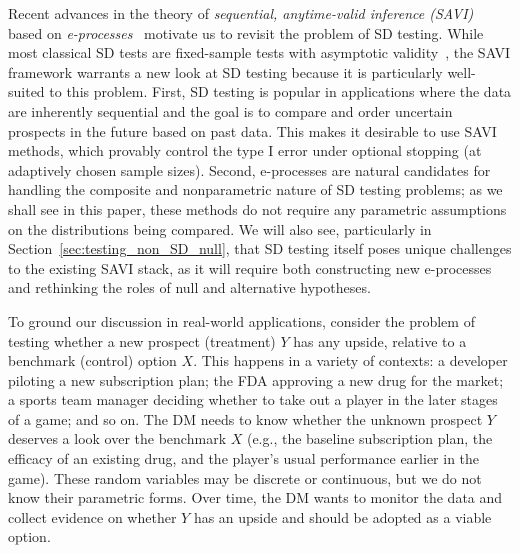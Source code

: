 \documentclass[12pt,twoside]{article}
\theoremstyle{plain}
\theoremstyle{definition}
\theoremstyle{remark}
\begin{document}
Recent advances in the theory of \emph{sequential, anytime-valid inference (SAVI)} based on \emph{e-processes}~\citep{shafer2011test,grunwald2019safe,ramdas2020admissible,ramdas2022game} motivate us to revisit the problem of SD testing. 
While most classical SD tests are fixed-sample tests with asymptotic validity~\citep[e.g.,][]{mcfadden1989testing,barrett2003consistent,linton2010improved}, the SAVI framework warrants a new look at SD testing because it is particularly well-suited to this problem. 
First, SD testing is popular in applications where the data are inherently sequential and the goal is to compare and order uncertain prospects in the future based on past data.
This makes it desirable to use SAVI methods, which provably control the type I error under optional stopping (at adaptively chosen sample sizes). 
Second, e-processes are natural candidates for handling the composite and nonparametric nature of SD testing problems; as we shall see in this paper, these methods do not require any parametric assumptions on the distributions being compared. 
We will also see, particularly in Section~\ref{sec:testing_non_SD_null}, that SD testing itself poses unique challenges to the existing SAVI stack, as it will require both constructing new e-processes and rethinking the roles of null and alternative hypotheses.


To ground our discussion in real-world applications, consider the problem of testing whether a new prospect (treatment) $Y$ has any upside, relative to a benchmark (control) option $X$. 
This happens in a variety of contexts: a developer piloting a new subscription plan; the FDA approving a new drug for the market; a sports team manager deciding whether to take out a player in the later stages of a game; and so on. 
The DM needs to know whether the unknown prospect $Y$ deserves a look over the benchmark $X$ (e.g., the baseline subscription plan, the efficacy of an existing drug, and the player's usual performance earlier in the game). 
These random variables may be discrete or continuous, but we do not know their parametric forms. 
Over time, the DM wants to monitor the data and collect evidence on whether $Y$ has an upside and should be adopted as a viable option. 
\end{document}
